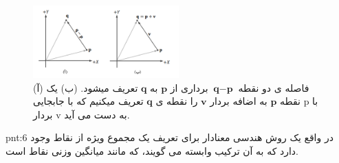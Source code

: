 {\begin{spacing}{1.5}
        \begin{figure}[H]
            \centering
            \setlength{\belowcaptionskip}{-10pt}
            \includegraphics[width=0.5\textwidth]{Images/4/4.Session.1.1.17}
            \caption {(آ) فاصله ی دو نقطه $\textbf{q}-\textbf{p}$ برداری از $\textbf{p}$ به $\textbf{q}$ تعریف میشود. (ب) یک نقطه $\textbf{p}$ به اضافه بردار $\textbf{v}$ را نقطه ی $\textbf{q}$ تعریف میکنیم که با جابجایی p با بردار v به دست می آید.}
            \label{fig:4.Session.1.1.17}
        \end{figure}

        \begin{point}{pnt:6}
            \Large
            در واقع یک روش هندسی معنادار برای تعریف یک مجموع ویژه از نقاط وجود دارد که به آن ترکیب وابسته می گویند، که مانند میانگین وزنی نقاط است.
        \end{point}
    \end{spacing}
}

